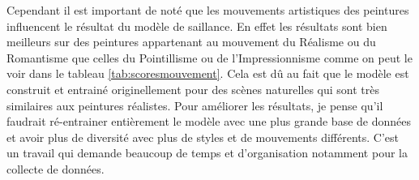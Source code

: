 \par
Cependant il est important de noté que les mouvements artistiques des peintures influencent le résultat du modèle de saillance. En effet les résultats sont bien meilleurs sur des peintures appartenant au mouvement du Réalisme ou du Romantisme que celles du Pointillisme ou de l'Impressionnisme comme on peut le voir dans le tableau \ref{tab:scoresmouvement}. Cela est dû au fait que le modèle est construit et entrainé originellement pour des scènes naturelles qui sont très similaires aux peintures réalistes. Pour améliorer les résultats, je pense qu'il faudrait ré-entrainer entièrement le modèle avec une plus grande base de données et avoir plus de diversité avec plus de styles et de mouvements différents. C'est un travail qui demande beaucoup de temps et d'organisation notamment pour la collecte de données.